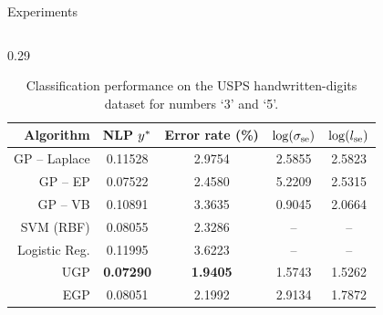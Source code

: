 \documentclass[final]{beamer}
\newlength{\onecolwid}
\newlength{\twocolwid}
\begin{document}
\begin{frame}[t]
\begin{columns}[t]
\begin{column}{\twocolwid}
\begin{columns}[t,totalwidth=\twocolwid]
\begin{column}{\twocolwid}
\begin{block}{Experiments}
\begin{columns}
\begin{column}{0.29\twocolwid}
\begin{table}[tb]
    \centering
    \caption[]{Classification performance on the USPS handwritten-digits
        dataset for numbers `3' and `5'.}
    \tiny
    \begin{tabular}{r| c c c c}
    Algorithm & NLP $y^{*}$ & Error rate (\%) 
        & $\log\!\left({\sigma_\text{se}}\right)$ & $\log\!\left({l_\text{se}}\right)$ \\
    \toprule
    GP -- Laplace & 0.11528 & 2.9754 & 2.5855 & 2.5823 \\
    GP -- EP & 0.07522 & 2.4580 & 5.2209 & 2.5315 \\
    GP -- VB & 0.10891 & 3.3635 & 0.9045 & 2.0664 \\ 
    SVM (RBF) & 0.08055 & 2.3286 & -- & -- \\
    Logistic Reg. & 0.11995 & 3.6223 & -- & -- \\
    \midrule
    UGP & \textbf{0.07290} & \textbf{1.9405} & 1.5743 & 1.5262 \\
    EGP & 0.08051 & 2.1992 & 2.9134 & 1.7872 \\
    \bottomrule
    \end{tabular}
    \label{tab:class}
\end{table}

\vfill

\end{column}
\end{columns}
\end{block}


\end{column} %









\end{columns} %


\end{column}
\end{columns}
\end{frame}
\end{document}
